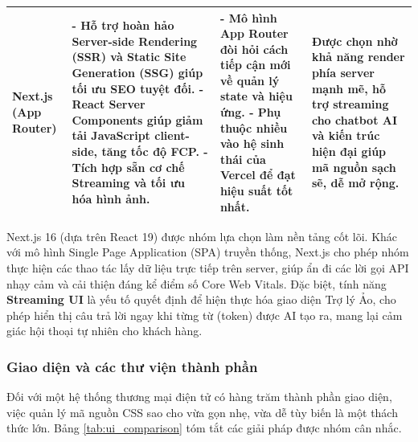 \begin{center}
\begin{longtable}{|p{2.5cm}|p{4cm}|p{4cm}|p{3.5cm}|}
        Next.js (App Router)                                                                                &
        - Hỗ trợ hoàn hảo Server-side Rendering (SSR) và Static Site Generation (SSG) giúp tối ưu SEO tuyệt đối. \newline
        - React Server Components giúp giảm tải JavaScript client-side, tăng tốc độ FCP. \newline
        - Tích hợp sẵn cơ chế Streaming và tối ưu hóa hình ảnh.                                             &
        - Mô hình App Router đòi hỏi cách tiếp cận mới về quản lý state và hiệu ứng. \newline
        - Phụ thuộc nhiều vào hệ sinh thái của Vercel để đạt hiệu suất tốt nhất.                            &
        Được chọn nhờ khả năng render phía server mạnh mẽ, hỗ trợ streaming cho chatbot AI và kiến trúc hiện đại giúp mã nguồn sạch sẽ, dễ mở rộng.                                                                         \\ \hline
    \end{longtable}
\end{center}

\vspace{-30pt}

Next.js 16 (dựa trên React 19) được nhóm lựa chọn làm nền tảng cốt lõi. Khác với mô hình Single Page Application (SPA) truyền thống, Next.js cho phép nhóm thực hiện các thao tác lấy dữ liệu trực tiếp trên server, giúp ẩn đi các lời gọi API nhạy cảm và cải thiện đáng kể điểm số Core Web Vitals. Đặc biệt, tính năng \textbf{Streaming UI} là yếu tố quyết định để hiện thực hóa giao diện Trợ lý Ảo, cho phép hiển thị câu trả lời ngay khi từng từ (token) được AI tạo ra, mang lại cảm giác hội thoại tự nhiên cho khách hàng.

\subsubsection{Giao diện và các thư viện thành phần}

Đối với một hệ thống thương mại điện tử có hàng trăm thành phần giao diện, việc quản lý mã nguồn CSS sao cho vừa gọn nhẹ, vừa dễ tùy biến là một thách thức lớn. Bảng \ref{tab:ui_comparison} tóm tắt các giải pháp được nhóm cân nhắc.

